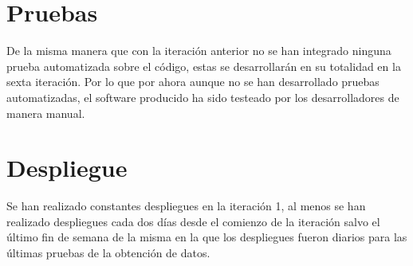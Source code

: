 
\clearpage

\section{Pruebas}

De la misma manera que con la iteración anterior no se han integrado ninguna prueba automatizada sobre el código, estas se desarrollarán en su totalidad en la sexta iteración. Por lo que por ahora aunque no se han desarrollado pruebas automatizadas, el software producido ha sido testeado por los desarrolladores de manera manual.

\section{Despliegue}

Se han realizado constantes despliegues en la iteración 1, al menos se han realizado despliegues cada dos días desde el comienzo de la iteración salvo el último fin de semana de la misma en la que los despliegues fueron diarios para las últimas pruebas de la obtención de datos.